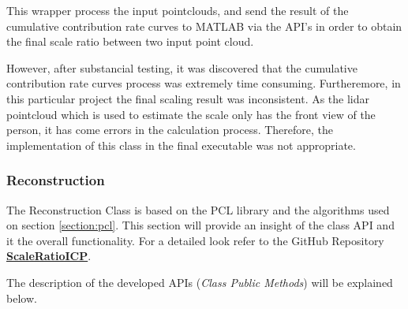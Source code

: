 \documentclass[12pt]{report}
\begin{document}
This wrapper process the input pointclouds, and send the result of the cumulative contribution rate curves to MATLAB via the API's in order to obtain the final scale ratio between two input point cloud.

However, after substancial testing, it was discovered that the cumulative contribution rate curves process was extremely time consuming. Furtheremore, in this particular project the final scaling result was inconsistent. 
As the lidar pointcloud which is used to estimate the scale only has the front view of the person, it has come errors in the calculation process. Therefore, the implementation of this class in the final executable was not appropriate.

\subsubsection{Reconstruction}
The Reconstruction Class is based on the PCL library and the algorithms used on section \ref{section:pcl}.
This section will provide an insight of the class API and it the overall functionality. For a detailed look refer to the GitHub Repository \textbf{\href{https://github.com/linbaowei/ScaleRatioICP} {ScaleRatioICP}}.

The description of the developed APIs (\textit{Class Public Methods}) will be explained below.
\end{document}
